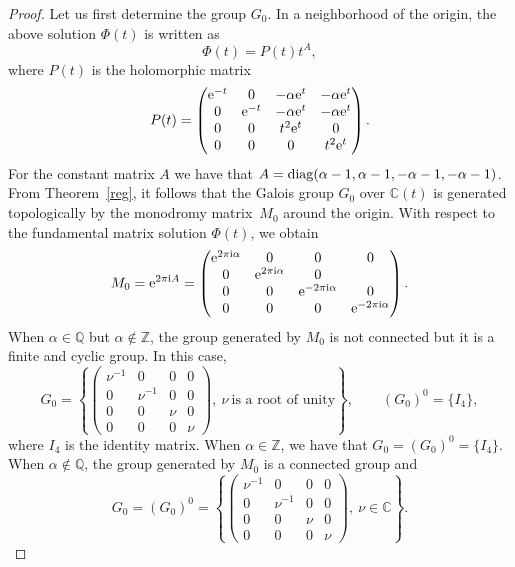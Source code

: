 \documentclass[10pt,a4paper]{amsart}
\numberwithin{equation}{section}
\begin{document}
\begin{proof}
 Let us first determine the group $G_0$.
 In a neighborhood of the origin, the above solution $\Phi(t)$ is written as
 \[
 \Phi(t)=P(t) t^A ,
 \]
 where $P(t)$ is the holomorphic matrix
 \[
 P(t)=\begin{pmatrix}
 {\rm e}^{-t} & 0 & -\alpha {\rm e}^t & -\alpha {\rm e}^t\\
 0 & {\rm e}^{-t} & - \alpha {\rm e}^t & -\alpha {\rm e}^t \\
 0 & 0 & t^2 {\rm e}^t & 0\\
 0 & 0 & 0 & t^2 {\rm e}^t
 \end{pmatrix} .
 \]
 For the constant matrix $A$ we have that $A={\rm diag} (\alpha-1, \alpha-1, -\alpha-1, -\alpha-1)$.
 From Theorem~\ref{reg}, it follows that the Galois group $G_0$ over $\mathbb{C}(t)$ is generated topologically by the monodromy matrix~$M_0$ around the origin.
 With respect to the fundamental matrix solution $\Phi(t)$, we obtain
 \[
 M_0={\rm e}^{2 \pi {\rm i} A}=\begin{pmatrix}
 {\rm e}^{2 \pi {\rm i} \alpha} & 0 & 0 & 0\\
 0 & {\rm e}^{2 \pi {\rm i} \alpha} & 0\\
 0 & 0 & {\rm e}^{-2 \pi {\rm i} \alpha} & 0\\
 0 & 0 & 0 & {\rm e}^{-2 \pi {\rm i} \alpha}
 \end{pmatrix} .
 \]
 When $\alpha\in\mathbb{Q}$ but $\alpha\notin\mathbb{Z}$, the group generated by $M_0$ is not connected but it is a finite and cyclic group. In this case,
 \[
 G_0=\left\{\begin{pmatrix}
 \nu^{-1} & 0 & 0 & 0\\
 0 & \nu^{-1} & 0 & 0\\
 0 & 0 & \nu & 0\\
 0 & 0 & 0 & \nu
 \end{pmatrix}, \ \nu \ \text{is a root of unity} \right\}, \qquad (G_0)^0=\{I_4\} ,
 \]
 where $I_4$ is the identity matrix. When $\alpha\in\mathbb{Z}$, we have that $G_0=(G_0)^0=\{I_4\}$. When $\alpha\notin\mathbb{Q}$, the group generated by $M_0$ is a connected group
 and
 \[
 G_0=(G_0)^0=\left\{ \begin{pmatrix}
 \nu^{-1} & 0 & 0 & 0\\
 0 & \nu^{-1} & 0 & 0\\
 0 & 0 & \nu & 0\\
 0 & 0 & 0 & \nu
 \end{pmatrix},\ \nu\in\mathbb{C} \right\} .
 \]


\end{proof}
\end{document}

